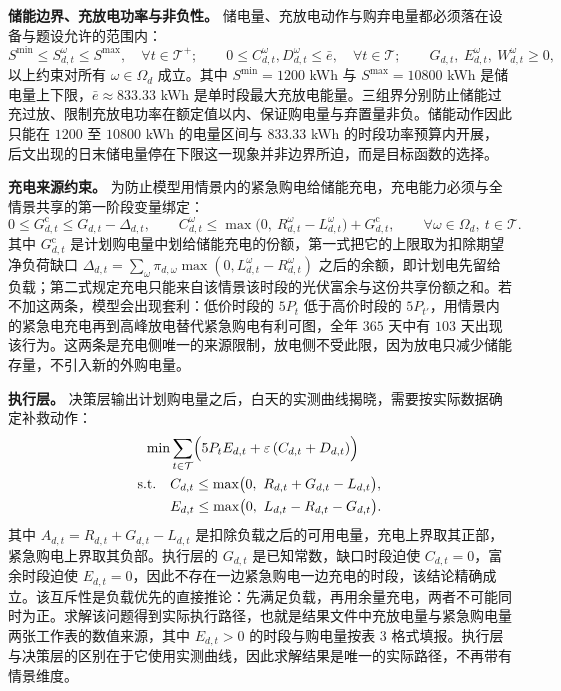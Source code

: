 \textbf{储能边界、充放电功率与非负性。} 储电量、充放电动作与购弃电量都必须落在设备与题设允许的范围内：
\begin{equation}
S^{\min} \le S_{d,t}^{\omega} \le S^{\max}, \quad \forall t \in \mathcal{T}^+; \qquad
0 \le C_{d,t}^{\omega}, D_{d,t}^{\omega} \le \bar{e}, \quad \forall t \in \mathcal{T}; \qquad
G_{d,t},\ E_{d,t}^{\omega},\ W_{d,t}^{\omega} \ge 0,\label{eq:bound2}
\end{equation}
以上约束对所有 $\omega \in \Omega_d$ 成立。其中 $S^{\min}=1200$ kWh 与 $S^{\max}=10800$ kWh 是储电量上下限，$\bar e\approx833.33$ kWh 是单时段最大充放电能量。三组界分别防止储能过充过放、限制充放电功率在额定值以内、保证购电量与弃置量非负。储能动作因此只能在 $1200$ 至 $10800$ kWh 的电量区间与 $833.33$ kWh 的时段功率预算内开展，后文出现的日末储电量停在下限这一现象并非边界所迫，而是目标函数的选择。

\textbf{充电来源约束。} 为防止模型用情景内的紧急购电给储能充电，充电能力必须与全情景共享的第一阶段变量绑定：
\begin{equation}
0 \le G^{\mathrm{c}}_{d,t} \le G_{d,t} - \Delta_{d,t}, \qquad
C_{d,t}^{\omega} \le \max\bigl(0,\ R_{d,t}^{\omega} - L_{d,t}^{\omega}\bigr) + G^{\mathrm{c}}_{d,t},
\qquad \forall \omega \in \Omega_d,\ t \in \mathcal{T}.\label{eq:charge2}
\end{equation}
其中 $G^{\mathrm{c}}_{d,t}$ 是计划购电量中划给储能充电的份额，第一式把它的上限取为扣除期望净负荷缺口 $\Delta_{d,t}=\sum_\omega\pi_{d,\omega}\max(0,L^{\omega}_{d,t}-R^{\omega}_{d,t})$ 之后的余额，即计划电先留给负载；第二式规定充电只能来自该情景该时段的光伏富余与这份共享份额之和。若不加这两条，模型会出现套利：低价时段的 $5P_t$ 低于高价时段的 $5P_{t'}$，用情景内的紧急电充电再到高峰放电替代紧急购电有利可图，全年 $365$ 天中有 $103$ 天出现该行为。这两条是充电侧唯一的来源限制，放电侧不受此限，因为放电只减少储能存量，不引入新的外购电量。

\textbf{执行层。} 决策层输出计划购电量之后，白天的实测曲线揭晓，需要按实际数据确定补救动作：
\begin{align}
\min &\sum_{t \in \mathcal{T}} \Bigl(5 P_t E_{d,t} + \varepsilon\,(C_{d,t}+D_{d,t})\Bigr) \notag\\
\text{s.t.}\quad & C_{d,t} \le \max\bigl(0,\ R_{d,t}+G_{d,t}-L_{d,t}\bigr), \notag\\
& E_{d,t} \le \max\bigl(0,\ L_{d,t}-R_{d,t}-G_{d,t}\bigr).\label{eq:exec2}
\end{align}
其中 $A_{d,t}=R_{d,t}+G_{d,t}-L_{d,t}$ 是扣除负载之后的可用电量，充电上界取其正部，紧急购电上界取其负部。执行层的 $G_{d,t}$ 是已知常数，缺口时段迫使 $C_{d,t}=0$，富余时段迫使 $E_{d,t}=0$，因此不存在一边紧急购电一边充电的时段，该结论精确成立。该互斥性是负载优先的直接推论：先满足负载，再用余量充电，两者不可能同时为正。求解该问题得到实际执行路径，也就是结果文件中充放电量与紧急购电量两张工作表的数值来源，其中 $E_{d,t}>0$ 的时段与购电量按表 3 格式填报。执行层与决策层的区别在于它使用实测曲线，因此求解结果是唯一的实际路径，不再带有情景维度。

